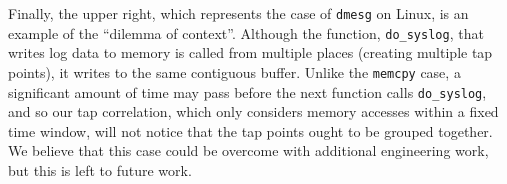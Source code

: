 Finally, the upper right, which represents the case of \texttt{dmesg} on
Linux, is an example of the ``dilemma of context''. Although the
function, \texttt{do\_syslog}, that writes log data to memory  is called
from multiple places (creating multiple tap points), it writes to the
same contiguous buffer. Unlike the \texttt{memcpy} case, a significant
amount of time may pass before the next function calls
\texttt{do\_syslog}, and so our tap correlation, which only considers
memory accesses within a fixed time window, will not notice that the tap
points ought to be grouped together. We believe that this case could be
overcome with additional engineering work, but this is left to future
work.
